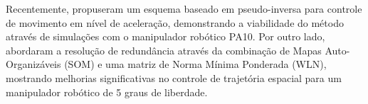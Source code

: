 Recentemente, \cite{li2023pseudo} propuseram um esquema baseado em pseudo-inversa para controle de movimento em nível de aceleração,
demonstrando a viabilidade do método através de simulações com o manipulador robótico PA10. Por outro lado, \cite{kuri2023som}
abordaram a resolução de redundância através da combinação de Mapas Auto-Organizáveis (SOM) e uma matriz de Norma Mínima Ponderada
(WLN), mostrando melhorias significativas no controle de trajetória espacial para um manipulador robótico de 5 graus de liberdade.



